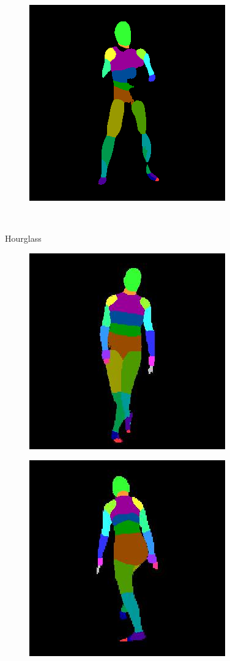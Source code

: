 \documentclass{beamer}
\begin{document}
\begin{frame}
\begin{figure}
\begin{subfigure}{.19\textwidth}
\end{subfigure}
\begin{subfigure}{.19\textwidth}
  \centering
  \includegraphics[scale=0.12]{104_52_c0002_segm_64_seg.png}\\
\end{subfigure}\\
\end{figure}
\begin{figure}
Hourglass
\centering
\begin{subfigure}{.198\textwidth}
\centering
  \includegraphics[scale=0.12]{ung_104_36_c0011_7.jpg}
\end{subfigure}%
\begin{subfigure}{.19\textwidth}
  \centering
  \includegraphics[scale=0.12]{36_10_c0019_10.jpg}

\end{subfigure}
\end{figure}
\end{frame}
\end{document}

